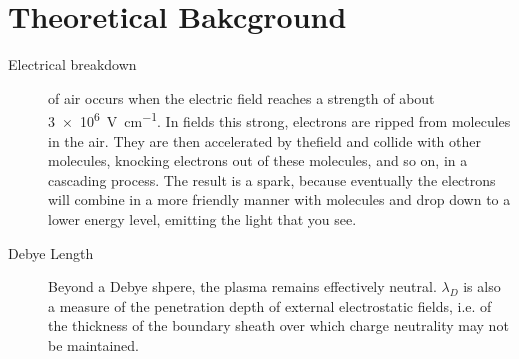 ﻿\documentclass[openany]{book}
\begin{document}
\chapter{Theoretical Bakcground}
\begin{description}
\item[Electrical  breakdown] of air occurs when the electric field reaches a strength of about \SI{3e6}{\volt\per\cm}. In fields this strong, electrons are ripped from molecules in the air. They are then accelerated by thefield and collide with other molecules, knocking electrons out of these molecules,  and  so  on,  in  a  cascading  process.  The  result  is  a spark, because eventually the electrons will combine in a more friendly manner with molecules and drop down to a lower energy level, emitting the light that you see.
\item[Debye Length] Beyond a Debye shpere, the plasma remains effectively neutral. $\lambda_D$ is also a measure of the penetration depth of external electrostatic fields, i.e. of the thickness of the boundary sheath over which charge neutrality may not be maintained.


\end{description}
\end{document}
